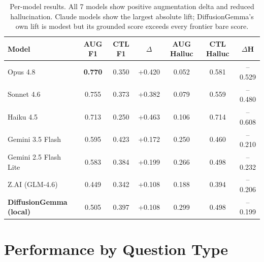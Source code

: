 \documentclass[11pt]{article}
\begin{document}
\begin{samepage}
\begin{table}[h]\centering\small
\begin{tabular}{lcccccc}
\toprule
Model & AUG F1 & CTL F1 & $\Delta$ & AUG Halluc & CTL Halluc & $\Delta$H \\
\midrule
Opus 4.8 & \textbf{0.770} & 0.350 & \textcolor{burnt}{+0.420} & 0.052 & 0.581 & \textcolor{teal0}{--0.529} \\
Sonnet 4.6 & 0.755 & 0.373 & \textcolor{burnt}{+0.382} & 0.079 & 0.559 & \textcolor{teal0}{--0.480} \\
Haiku 4.5 & 0.713 & 0.250 & \textcolor{burnt}{+0.463} & 0.106 & 0.714 & \textcolor{teal0}{--0.608} \\
Gemini 3.5 Flash & 0.595 & 0.423 & \textcolor{burnt}{+0.172} & 0.250 & 0.460 & \textcolor{teal0}{--0.210} \\
Gemini 2.5 Flash Lite & 0.583 & 0.384 & \textcolor{burnt}{+0.199} & 0.266 & 0.498 & \textcolor{teal0}{--0.232} \\
Z.AI (GLM-4.6) & 0.449 & 0.342 & \textcolor{burnt}{+0.108} & 0.188 & 0.394 & \textcolor{teal0}{--0.206} \\
\midrule
\textbf{DiffusionGemma (local)} & 0.505 & 0.397 & \textcolor{burnt}{+0.108} & 0.299 & 0.498 & \textcolor{teal0}{--0.199} \\
\bottomrule
\end{tabular}
\caption{Per-model results. All 7 models show positive augmentation delta and reduced
hallucination. Claude models show the largest absolute lift; DiffusionGemma's own lift is modest
but its grounded score exceeds every frontier bare score.}
\end{table}
\end{samepage}

\section{Performance by Question Type}
\end{document}
